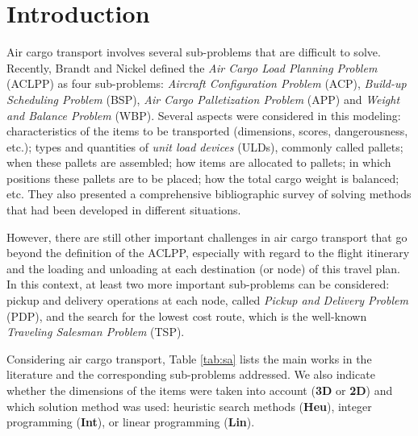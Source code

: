 \documentclass[preprint]{elsarticle}
\begin{document}
\label{sec1}
\section{Introduction}


Air cargo transport involves several sub-problems that are difficult to solve. Recently, Brandt and Nickel \cite[p. 401]{BrandtStefan2019} defined the {\it Air Cargo Load Planning Problem} (ACLPP) as four sub-problems: {\it Aircraft Configuration Problem} (ACP), {\it Build-up Scheduling Problem} (BSP), {\it Air Cargo Palletization Problem} (APP) and {\it Weight and Balance Problem} (WBP). Several aspects were considered in this modeling: characteristics of the items to be transported (dimensions, scores, dangerousness, etc.); types and quantities of {\it unit load devices} (ULDs), commonly called pallets; when these pallets are assembled; how items are allocated to pallets; in which positions these pallets are to be placed; how the total cargo weight is balanced; etc. They also presented a comprehensive bibliographic survey of solving methods that had been developed in different situations.

However, there are still other important challenges in air cargo transport that go beyond the definition of the ACLPP, especially with regard to the flight itinerary and the loading and unloading at each destination (or node) of this travel plan. In this context, at least two more important sub-problems can be considered: pickup and delivery operations at each node, called {\it Pickup and Delivery Problem} (PDP), and the search for the lowest cost route, which is the well-known {\it Traveling Salesman Problem} (TSP).

Considering air cargo transport, Table \ref{tab:sa} lists the main works in the literature and the corresponding sub-problems addressed. We also indicate whether the dimensions of the items were taken into account ({\bf 3D} or {\bf 2D}) and which solution method was used: heuristic search methods ({\bf Heu}), integer programming ({\bf Int}), or linear programming ({\bf Lin}).
\end{document}
